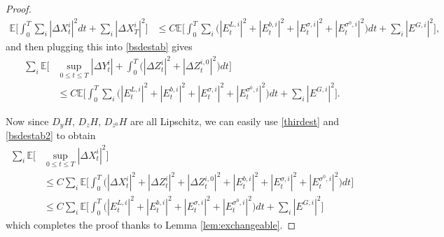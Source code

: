 \documentclass[11pt,reqno]{amsart}
\numberwithin{equation}{section}
\theoremstyle{definition}
\def\E{{\mathbb E}}
\def \E{\mathbb{E}}
\begin{document}
\begin{proof}
\begin{align} \label{thirdest}
  \E\bigg[\int_0^T \sum_i |\Delta X_t^i|^2 dt + \sum_i |\Delta X_T^i|^2 \bigg] &\leq C \E \bigg[ \int_0^T  \sum_i \Big(|E_t^{L,i}|^2 + |E_t^{b,i}|^2 + |E_t^{\sigma,i}|^2 + |E^{\sigma^0,i}_t|^2  \Big) dt +  \sum_i |E^{G,i}|^2 \bigg],
\end{align} 
and then plugging this into \eqref{bsdestab} gives 
\begin{align} \label{bsdestab2}
\sum_i \E\bigg[&\sup_{0 \leq t \leq T} |\Delta Y_t^i| + \int_0^T 
\Big(|\Delta Z_t^i|^2 + |\Delta Z_t^{i,0}|^2 \Big) dt \bigg]
\nonumber \\
&\leq  C \E \bigg[ \int_0^T  \sum_i \Big(|E_t^{L,i}|^2 + |E_t^{b,i}|^2 + |E_t^{\sigma,i}|^2 + |E_t^{\sigma^0,i}|^2  \Big) dt +  \sum_i |E^{G,i}|^2 \bigg].
\end{align}

Now since $D_yH$, $D_z H$, $D_{z^0}H$ are all Lipschitz, we can easily use \eqref{thirdest} and \eqref{bsdestab2} to obtain
\begin{align*}
\sum_i \E\big[& \sup_{0 \leq t \leq T} |\Delta X_t^i|^2 \big] 
\\
&\leq C \sum_i \E\bigg[\int_0^T \Big( |\Delta X_t^i|^2 + |\Delta Z_t^i|^2 + |\Delta Z_t^{i,0}|^2 + |E_t^{b,i}|^2 + |E_t^{\sigma,i}|^2 + |E_t^{\sigma^0,i}|^2 \Big)dt \bigg]  \\
&\leq C \sum_i \E \bigg[ \int_0^T \Big(|E_t^{L,i}|^2 + |E_t^{b,i}|^2 + |E_t^{\sigma,i}|^2 + |E^{\sigma^0,i}_t|^2 \Big) dt +  \sum_i |E^{G,i}|^2 \bigg]
\end{align*}
which completes the proof thanks to Lemma \ref{lem:exchangeable}. 


\end{proof}
\end{document}
